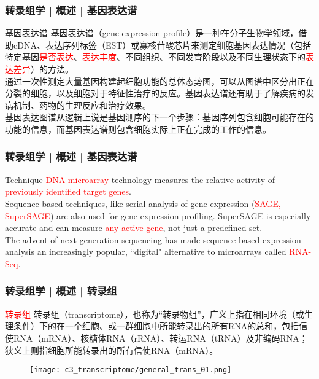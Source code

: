 \begin{frame}
  \frametitle{转录组学 | 概述 | 基因表达谱}
  \begin{block}{基因表达谱}
    基因表达谱（gene expression profile）是一种在分子生物学领域，借助cDNA、表达序列标签（EST）或寡核苷酸芯片来测定细胞基因表达情况（包括特定基因\textcolor{red}{是否表达}、\textcolor{red}{表达丰度}、不同组织、不同发育阶段以及不同生理状态下的\textcolor{red}{表达差异}）的方法。\\
\vspace{1em}
通过一次性测定大量基因构建起细胞功能的总体态势图，可以从图谱中区分出正在分裂的细胞，以及细胞对于特征性治疗的反应。基因表达谱还有助于了解疾病的发病机制、药物的生理反应和治疗效果。\\
\vspace{1em}
基因表达图谱从逻辑上说是基因测序的下一个步骤：基因序列包含细胞可能存在的功能的信息，而基因表达谱则包含细胞实际上正在完成的工作的信息。
  \end{block}
\end{frame}

\begin{frame}
  \frametitle{转录组学 | 概述 | 基因表达谱}
  \begin{block}{Technique}
    \textcolor{red}{DNA microarray} technology measures the relative activity of \textcolor{red}{previously identified target genes}.\\
    \vspace{1em}
    Sequence based techniques, like serial analysis of gene expression (\textcolor{red}{SAGE, SuperSAGE}) are also used for gene expression profiling. SuperSAGE is especially accurate and can measure \textcolor{red}{any active gene}, not just a predefined set.\\
 \vspace{1em}
 The advent of next-generation sequencing has made sequence based expression analysis an increasingly popular, ``digital" alternative to microarrays called \textcolor{red}{RNA-Seq}. 
  \end{block}
\end{frame}

\begin{frame}
  \frametitle{转录组学 | 概述 | 转录组}
  \begin{block}{\textcolor{red}{转录组}}
转录组（transcriptome），也称为“转录物组”，广义上指在相同环境（或生理条件）下的在一个细胞、或一群细胞中所能转录出的所有RNA的总和，包括信使RNA（mRNA）、核糖体RNA（rRNA）、转运RNA（tRNA）及非编码RNA；狭义上则指细胞所能转录出的所有信使RNA（mRNA）。
  \end{block}
  \begin{figure}
    \centering
    \texttt{[image: c3\_transcriptome/general\_trans\_01.png]}
  \end{figure}
\end{frame}


